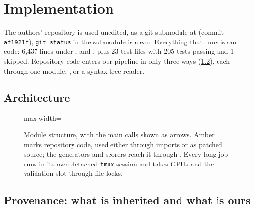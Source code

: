 \chapter{Implementation}\label{ch:impl}

The authors' repository is used unedited, as a git submodule at  (commit
\texttt{af1921f}); \texttt{git status} in the submodule is clean. Everything that runs is our code: 6,437 lines under
,  and , plus 23 test files with 205 tests passing and 1 skipped. Repository
code enters our pipeline in only three ways (\cref{sec:provenance}), each through one module, , or a
syntax-tree reader.

\section{Architecture}

\begin{figure}[htbp]
\centering
\begin{adjustbox}{max width=\linewidth}\end{adjustbox}
\caption{Module structure, with the main calls shown as arrows. Amber marks repository code, used either through
imports or as patched source; the generators and scorers reach it through . Every long job runs in its own detached \texttt{tmux} session and takes GPUs and the
validation slot through file locks.}
\label{fig:architecture}
\end{figure}

\section{Provenance: what is inherited and what is ours}\label{sec:provenance}

